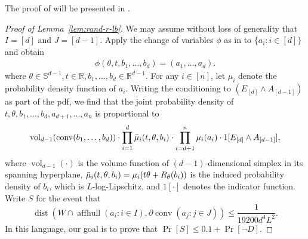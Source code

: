 \documentclass{article}\usepackage[a4paper,margin=20mm]{geometry}
\newcommand{\R}{\mathbb R}
\newcommand{\aff}{\operatorname{affhull}}
\newcommand{\conv}{\operatorname{conv}}
\newcommand{\dist}{\operatorname{dist}}
\newcommand{\vol}{\operatorname{vol}}
\begin{document}
The proof of  will be presented in .


\begin{proof}[Proof of Lemma~\ref{lem:rand-r-lb}]
We may assume without loss of generality that $I = [d]$ and $J = [d-1]$.
Apply the change of variables $\phi$ as in  to $\{a_i : i\in [d]\}$ and obtain
\begin{align*}
    \phi(\theta, t, b_1, \ldots, b_d) = (a_1, \ldots, a_d).
\end{align*}
where $\theta \in \mathbb{S}^{d-1}, t \in \R, b_1, \ldots, b_d \in \R^{d-1}$.
For any $i\in [n]$, let $\mu_i$ denote the probability density function of
$a_i$.
Writing the conditioning to $(E_{[d]} \wedge A_{[d-1]})$ as part of the pdf, we find that the joint probability density of $t,
\theta, b_1, \ldots, b_d, a_{d+1},\dots,a_n$ is proportional to
\begin{align}
    \vol_{d-1}(\conv(b_1, \ldots, b_d)) \cdot \prod_{i=1}^d \Bar{\mu}_i(t,\theta,b_i) \cdot \prod_{i=d+1}^n \mu_i(a_i) \cdot 1[E_{[d]} \wedge A_{[d-1]}], \label{eq:prob-bi}
\end{align}
where $\vol_{d-1}(\cdot )$ is the volume function of $(d-1)$-dimensional simplex in its spanning hyperplane,
$\Bar{\mu}_i(t,\theta,b_i) = \mu_i(t\theta + R_\theta(b_i))$ is the induced
probability density of $b_i$, which is $L$-log-Lipschitz, and $1[\cdot]$ denotes the indicator
function.
Write $S$ for the event that
$$\dist(W \cap \aff(a_i : i\in I), \partial \conv(a_j : j\in J )) \leq \frac{1}{19200 d^4L^2}.$$
In this language, our goal is to prove that
$\Pr[S] \leq 0.1 + \Pr[\neg D]$.


\end{proof}
\end{document}
